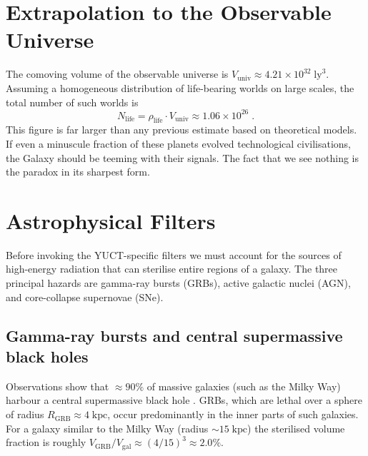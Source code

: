 \documentclass[12pt,a4paper]{article}
\begin{document}
	\section{Extrapolation to the Observable Universe}
	\label{sec:extrapolation}
	The comoving volume of the observable universe is
	$V_{\mathrm{univ}} \approx 4.21\times 10^{32}\;\mathrm{ly}^{3}$.
	Assuming a homogeneous distribution of life-bearing worlds on large
	scales, the total number of such worlds is
	\begin{equation}
		\label{eq:N_life_total}
		N_{\mathrm{life}} = \rho_{\mathrm{life}} \cdot V_{\mathrm{univ}}
		\approx 1.06\times 10^{26}\; .
	\end{equation}
	This figure is far larger than any previous estimate based on
	theoretical models.  If even a minuscule fraction of these planets
	evolved technological civilisations, the Galaxy should be teeming with
	their signals.  The fact that we see nothing is the paradox in its
	sharpest form.
	
	\section{Astrophysical Filters}
	\label{sec:astro_filters}
	Before invoking the YUCT-specific filters we must account for the
	sources of high-energy radiation that can sterilise entire regions of a
	galaxy.  The three principal hazards are gamma-ray bursts (GRBs),
	active galactic nuclei (AGN), and core-collapse supernovae (SNe).
	
	\subsection{Gamma-ray bursts and central supermassive black holes}
	\label{sec:grb}
	Observations show that $\approx 90\%$ of massive galaxies (such as the
	Milky Way) harbour a central supermassive black hole \citep{Chandra2025}.
	GRBs, which are lethal over a sphere of radius $R_{\mathrm{GRB}} \approx
	4\;\mathrm{kpc}$, occur predominantly in the inner parts of such
	galaxies.  For a galaxy similar to the Milky Way (radius $\sim
	15\;\mathrm{kpc}$) the sterilised volume fraction is roughly
	$V_{\mathrm{GRB}}/V_{\mathrm{gal}} \approx (4/15)^{3} \approx 2.0\%$.
	
\end{document}
